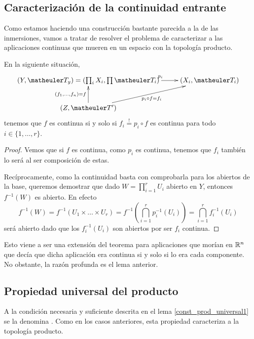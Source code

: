 \subsection{Caracterización de la continuidad entrante}
Como estamos haciendo una construcción bastante parecida a la de las inmersiones, vamos a tratar de resolver el problema de caracterizar a las aplicaciones continuas que mueren en un espacio con la topología producto.

\begin{lem}
	\label{const_prod_universal1}
	En la siguiente situación,
	\[\xymatrix{
		(Y, \T_y)=(\prod_i X_i, \prod \T_i) \ar[r]^{\ \ \ \ \ \ \ \ \ \ p_i} & 
		(X_i,\T_i) \\
		(Z,\T') \ar[u]^{(f_1,\dots,f_n)=f} \ar[ru]_{p_i\circ f=f_i} &
	}\]
	tenemos que $f$ es continua si y solo si $f_i\stackrel{!}{=}p_i\circ f$ es continua para todo $i\in\{1,\dots,r\}$.
\end{lem}
\begin{proof}
	Vemos que si $f$ es continua, como $p_i$ es continua, tenemos que $f_i$ también lo será al ser composición de estas.
	
	Recíprocamente, como la continuidad basta con comprobarla para los abiertos de la base, queremos demostrar que dado $W=\prod_{i=1}^rU_i$ abierto en $Y$, entonces $f^{-1}(W)$ es abierto. En efecto
	\[f^{-1}(W)=f^{-1}(U_1\times\dots\times U_r)=f^{-1}\left(\bigcap_{i=1}^r p_i^{-1}(U_i)\right)=\bigcap_{i=1}^r f_i^{-1}(U_i)\] será abierto dado que los $f_i^{-1}(U_i)$ son abiertos por ser $f_i$ continua.
\end{proof}
\begin{obs}[Extensión]
	Esto viene a ser una extensión del teorema para aplicaciones que morían en $\mathbb{R}^n$ que decía que dicha aplicación era continua si y solo si lo era cada componente. No obstante, la razón profunda es el lema anterior.
\end{obs} 
\subsection{Propiedad universal del producto}

A la condición necesaria y suficiente descrita en el lema \ref{const_prod_universal1} se la denomina . Como en los casos anteriores, esta propiedad caracteriza a la topología producto.

